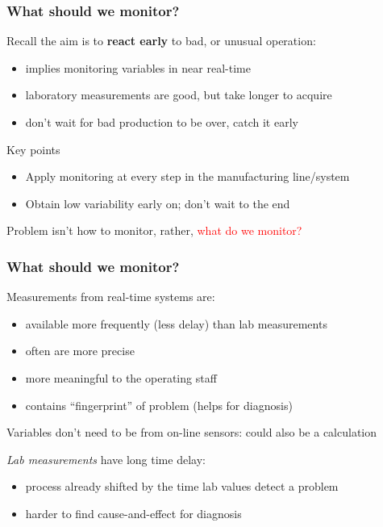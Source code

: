 \begin{frame}\frametitle{What should we monitor?}
	
	Recall the aim is to \textbf{react early} to bad, or unusual operation: 
	\begin{itemize}
		\item	implies monitoring variables in near real-time 
		\item	laboratory measurements are good, but take longer to acquire 
		\item	don't wait for bad production to be over, catch it early 
	\end{itemize}
	\begin{block}
		{Key points} 
		\begin{center}
			\begin{itemize}
				\item	Apply monitoring at every step in the manufacturing line/system 
				\item	Obtain low variability early on; don't wait to the end 
			\end{itemize}
		\end{center}
	\end{block}
	
	Problem isn't how to monitor, rather, \textcolor{red}{what do we monitor?}
\end{frame}

\begin{frame}\frametitle{What should we monitor?}
	
	Measurements from real-time systems are: 
	\begin{itemize}
		\item	available more frequently (less delay) than lab measurements 
		\item	often are more precise 
		\item	more meaningful to the operating staff 
		\item	contains ``fingerprint'' of problem (helps for diagnosis) 
	\end{itemize}
	
	Variables don't need to be from on-line sensors: could also be a calculation
	
	\emph{Lab measurements} have long time delay: 
	\begin{itemize}
		\item	process already shifted by the time lab values detect a problem 
		\item	harder to find cause-and-effect for diagnosis 
	\end{itemize}
\end{frame}

